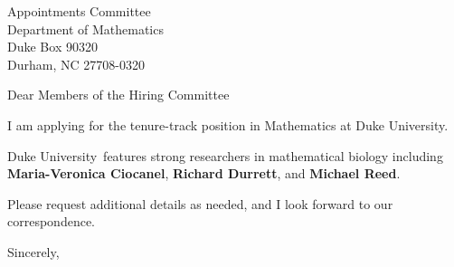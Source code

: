 




	
	
	\def\School{Duke University}
	
	\begin{letter}
		{Appointments Committee\\
			Department of Mathematics\\
			Duke Box 90320\\
			Durham, NC 27708-0320
		}
		
		\opening{Dear Members of the Hiring Committee}
		
		
		I am applying for the tenure-track position in Mathematics at \School. 
		
		
		
		\School~features strong researchers in mathematical biology including \textbf{Maria-Veronica Ciocanel}, \textbf{Richard Durrett},  and \textbf{Michael  Reed}. 
		
		
		
		
		
		Please request additional details as needed, and I look forward to our correspondence.
		
		\closing{Sincerely,}
	\end{letter}
